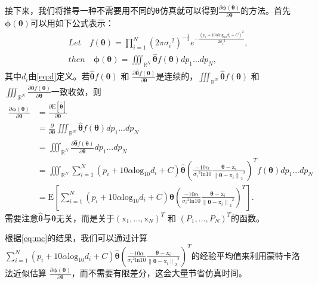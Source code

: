 接下来，我们将推导一种不需要用不同的$\bm\theta$仿真就可以得到${\frac{\partial\bm\phi(\bm{\theta})}{\partial \bm\theta}}$的方法。首先 $\bm\phi(\bm{\theta})$可以用如下公式表示：
\begin{equation}
\begin{split}
&Let \quad f(\bm{\theta}) = {\prod\limits_{i=1}^N}(2\pi{\sigma_i}^2)^{-\frac{1}{2}}e^{-\frac{(p_i + 10\alpha\mathrm{log}_{10}{d_i} + C)^2}{2{\sigma_i}^2}},\\
&then \quad \bm\phi(\bm{\theta}) = \iiint_{\mathbb{R}^N}\widehat{\bm{\theta}}f(\bm{\theta})dp_1...dp_N,
\end{split}
\end{equation}
其中$d_i$由\eqref{eq:d}定义。若$\widehat{\bm{\theta}}f(\bm{\theta})$ 和 $\frac{\partial \widehat{\bm{\theta}}f(\bm\theta)}{\partial \bm{\theta}}$是连续的，$\iiint_{\mathbb{R}^N}\widehat{\bm{\theta}}f(\bm\theta)$ 和 $\iiint_{\mathbb{R}^N}\frac{\partial \widehat{\bm{\theta}}f(\bm\theta)}{\partial \bm{\theta}}$一致收敛，则
\begin{equation}
\begin{split}
{\frac{\partial\bm\phi(\bm{\theta})}{\partial \bm\theta}} &= \frac{\partial\mathrm{E}[\widehat{\bm{\theta}}]}{\partial \bm{\theta}}\\
&= \frac{\partial}{\partial \bm{\theta}}\iiint_{\mathbb{R}^N} \widehat{\bm{\theta}}f(\bm{\theta}) dp_1...dp_N\\
&= \iiint_{\mathbb{R}^N} \frac{\partial \widehat{\bm{\theta}}f(\bm{\theta})}{\partial \bm{\theta}} dp_1...dp_N\\
&= \iiint_{\mathbb{R}^N} \sum\limits_{i=1}^N(p_i + 10\alpha\mathrm{log}_{10}{d_i} + C) \widehat{\bm{\theta}}(\frac{-10\alpha}{{\sigma_i}^2\mathrm{ln}10}\frac{{\bm\theta} - \bm{\mathrm{x}}_i}{{\left\|{\bm\theta} - \bm{\mathrm{x}}_i\right\|_2}^2})^Tf(\bm{\theta}) dp_1...dp_N\\
&= \mathrm{E}[\sum\limits_{i=1}^N(p_i + 10\alpha\mathrm{log}_{10}{d_i} + C)\widehat{\bm{\theta}}(\frac{-10\alpha}{{\sigma_i}^2\mathrm{ln}10}\frac{{\bm\theta} - \bm{\mathrm{x}}_i}{{\left\|{\bm\theta} - \bm{\mathrm{x}}_i\right\|_2}^2})^T]. \label{eq:mc}
\end{split}
\end{equation}
需要注意$\widehat{\bm{\theta}}$与$\bm{\theta}$无关，而是关于$(\bm{\mathrm{x}}_1,...,\bm{\mathrm{x}}_N)^T$ 和 $(P_1,...,P_N)^T$的函数。

根据\eqref{eq:mc}的结果，我们可以通过计算$\sum\limits_{i=1}^N(p_i + 10\alpha\mathrm{log}_{10}{d_i} + C)\widehat{\bm{\theta}}(\frac{-10\alpha}{{\sigma_i}^2\mathrm{ln}10}\frac{{\bm\theta} - \bm{\mathrm{x}}_i}{{\left\|{\bm\theta} - \bm{\mathrm{x}}_i\right\|_2}^2})^T$的经验平均值来利用蒙特卡洛法近似估算 ${\frac{\partial\bm\phi(\bm{\theta})}{\partial \bm\theta}}$，而不需要有限差分，这会大量节省仿真时间。

